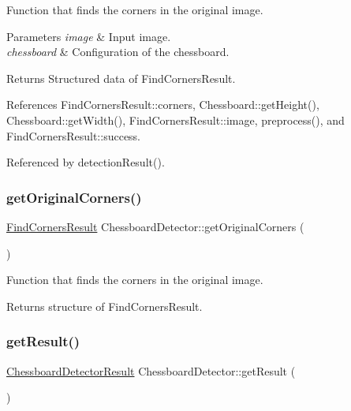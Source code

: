 Function that finds the corners in the original image. 


\begin{DoxyParams}{Parameters}
{\em image} & Input image. \\
\hline
{\em chessboard} & Configuration of the chessboard. \\
\hline
\end{DoxyParams}
\begin{DoxyReturn}{Returns}
Structured data of Find\+Corners\+Result. 
\end{DoxyReturn}


References Find\+Corners\+Result\+::corners, Chessboard\+::get\+Height(), Chessboard\+::get\+Width(), Find\+Corners\+Result\+::image, preprocess(), and Find\+Corners\+Result\+::success.



Referenced by detection\+Result().

\mbox{\label{classChessboardDetector_a7f8fd52d9bb23984c0db1c4115e75043}} 
\subsubsection{\texorpdfstring{get\+Original\+Corners()}{getOriginalCorners()}}
{\footnotesize\ttfamily \hyperlink{structFindCornersResult}{Find\+Corners\+Result} Chessboard\+Detector\+::get\+Original\+Corners (\begin{DoxyParamCaption}{ }\end{DoxyParamCaption})}



Function that finds the corners in the original image. 

\begin{DoxyReturn}{Returns}
structure of Find\+Corners\+Result. 
\end{DoxyReturn}
\mbox{\label{classChessboardDetector_a84f8880402d0829ed6fc13ed45a141c4}} 
\subsubsection{\texorpdfstring{get\+Result()}{getResult()}}
{\footnotesize\ttfamily \hyperlink{structChessboardDetectorResult}{Chessboard\+Detector\+Result} Chessboard\+Detector\+::get\+Result (\begin{DoxyParamCaption}{ }\end{DoxyParamCaption})}



